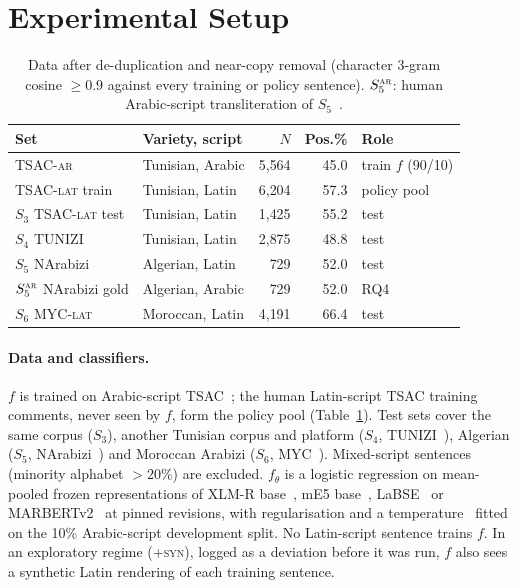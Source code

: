 \section{Experimental Setup}
\label{sec:setup}

\begin{table}[t]
\centering
\caption{Data after de-duplication and near-copy removal (character 3-gram cosine $\ge0.9$ against every training or policy sentence). $S_5^{\textsc{ar}}$: human Arabic-script transliteration of $S_5$~\cite{touileb2021interplay}.}
\label{tab:data}
\footnotesize\setlength{\tabcolsep}{4pt}
\begin{tabular}{@{}llrrl@{}}
\toprule
Set & Variety, script & $N$ & Pos.\% & Role\\
\midrule
TSAC-\textsc{ar} & Tunisian, Arabic & 5{,}564 & 45.0 & train $f$ (90/10)\\
TSAC-\textsc{lat} train & Tunisian, Latin & 6{,}204 & 57.3 & policy pool\\
$S_3$ TSAC-\textsc{lat} test & Tunisian, Latin & 1{,}425 & 55.2 & test\\
$S_4$ TUNIZI & Tunisian, Latin & 2{,}875 & 48.8 & test\\
$S_5$ NArabizi & Algerian, Latin & 729 & 52.0 & test\\
$S_5^{\textsc{ar}}$ NArabizi gold & Algerian, Arabic & 729 & 52.0 & RQ4\\
$S_6$ MYC-\textsc{lat} & Moroccan, Latin & 4{,}191 & 66.4 & test\\
\bottomrule
\end{tabular}
\end{table}

\paragraph{Data and classifiers.}
$f$ is trained on Arabic-script TSAC~\cite{medhaffar2017tsac}; the human Latin-script TSAC training comments, never seen by $f$, form the policy pool (Table~\ref{tab:data}). Test sets cover the same corpus ($S_3$), another Tunisian corpus and platform ($S_4$, TUNIZI~\cite{fourati2021tunizi}), Algerian ($S_5$, NArabizi~\cite{seddah2020narabizi,touileb2021interplay}) and Moroccan Arabizi ($S_6$, MYC~\cite{jbel2023myc}). Mixed-script sentences (minority alphabet $>20\%$) are excluded. $f_\theta$ is a logistic regression on mean-pooled frozen representations of XLM-R base~\cite{conneau2020xlmr}, mE5 base~\cite{wang2024me5}, LaBSE~\cite{feng2022labse} or MARBERTv2~\cite{abdulmageed2021marbert} at pinned revisions, with regularisation and a temperature~\cite{guo2017calibration} fitted on the 10\% Arabic-script development split. No Latin-script sentence trains $f$. In an exploratory regime (\textsc{+syn}), logged as a deviation before it was run, $f$ also sees a synthetic Latin rendering of each training sentence.

